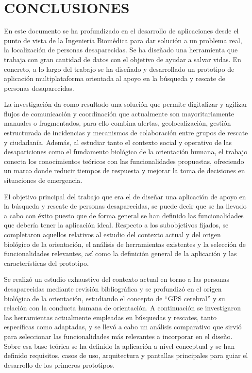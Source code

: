 \chapter{CONCLUSIONES}
En este documento se ha profundizado en el desarrollo de aplicaciones desde el punto de vista de la Ingeniería Biomédica para dar solución a un problema real, la localización de personas desaparecidas. Se ha diseñado una herramienta que trabaja con gran cantidad de datos con el objetivo de ayudar a salvar vidas. En concreto, a lo largo del trabajo se ha diseñado y desarrollado un prototipo de aplicación multiplataforma orientada al apoyo en la búsqueda y rescate de personas desaparecidas. 

La investigación da como resultado una solución que permite digitalizar y agilizar flujos de comunicación y coordinación que actualmente son mayoritariamente manuales o fragmentados, para ello combina alertas, geolocalización, gestión estructurada de incidencias y mecanismos de colaboración entre grupos de rescate y ciudadanía. Además, al estudiar tanto el contexto social y operativo de las desapariciones como el fundamento biológico de la orientación humana, el trabajo conecta los conocimientos teóricos con las funcionalidades propuestas, ofreciendo un marco donde reducir tiempos de respuesta y mejorar la toma de decisiones en situaciones de emergencia.

El objetivo principal del trabajo que era el de diseñar una aplicación de apoyo en la búsqueda y rescate de personas desaparecidas, se puede decir que se ha llevado a cabo con éxito puesto que de forma general se han definido las funcionalidades que debería tener la aplicación ideal. Respecto a los subobjetivos fijados, se completaron aquellos relativos al estudio del contexto actual y del origen biológico de la orientación, el análisis de herramientas existentes y la selección de funcionalidades relevantes, así como la definición general de la aplicación y las características del prototipo. 

Se realizó un estudio exhaustivo del contexto actual en torno a las personas desaparecidas mediante revisión bibliográfica y se profundizó en el origen biológico de la orientación, estudiando el concepto de ``GPS cerebral'' y su relación con la conducta humana de orientación. A continuación se investigaron las herramientas actualmente empleadas en búsquedas y rescates, tanto específicas como adaptadas, y se llevó a cabo un análisis comparativo que sirvió para seleccionar las funcionalidades más relevantes a incorporar en el diseño. Sobre esa base teórica se ha definido la aplicación a nivel conceptual y se han definido requisitos, casos de uso, arquitectura y pantallas principales para guiar el desarrollo de los primeros prototipos.


